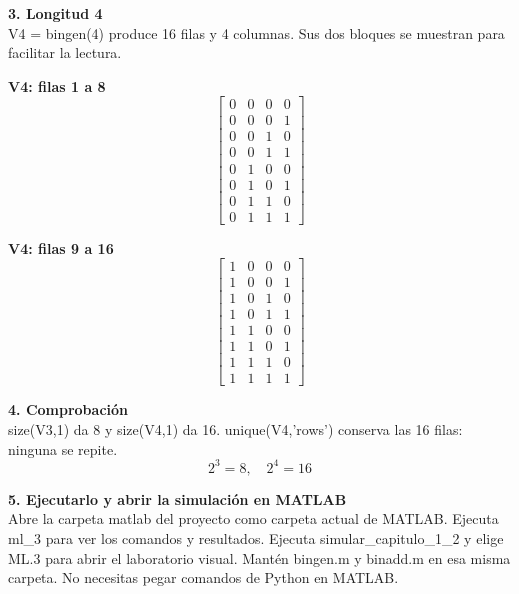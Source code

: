 \documentclass[11pt,a4paper,landscape]{article}
\begin{document}
\noindent\begin{minipage}{\linewidth}\textbf{3. Longitud 4}\\[2pt]V4 = bingen(4) produce 16 filas y 4 columnas. Sus dos bloques se muestran para facilitar la lectura.
\par\smallskip \begin{minipage}[t]{.47\linewidth}\centering \textbf{V4: filas 1 a 8}\[\begin{bmatrix}0 & 0 & 0 & 0\\0 & 0 & 0 & 1\\0 & 0 & 1 & 0\\0 & 0 & 1 & 1\\0 & 1 & 0 & 0\\0 & 1 & 0 & 1\\0 & 1 & 1 & 0\\0 & 1 & 1 & 1\end{bmatrix}\]\end{minipage}\hfill\begin{minipage}[t]{.47\linewidth}\centering \textbf{V4: filas 9 a 16}\[\begin{bmatrix}1 & 0 & 0 & 0\\1 & 0 & 0 & 1\\1 & 0 & 1 & 0\\1 & 0 & 1 & 1\\1 & 1 & 0 & 0\\1 & 1 & 0 & 1\\1 & 1 & 1 & 0\\1 & 1 & 1 & 1\end{bmatrix}\]\end{minipage}\par\smallskip
\end{minipage}\par\medskip
\noindent\begin{minipage}{\linewidth}\textbf{4. Comprobación}\\[2pt]size(V3,1) da 8 y size(V4,1) da 16. unique(V4,'rows') conserva las 16 filas: ninguna se repite.
\[2^3=8,\quad2^4=16\]
\end{minipage}\par\medskip
\noindent\begin{minipage}{\linewidth}\textbf{5. Ejecutarlo y abrir la simulación en MATLAB}\\[2pt]Abre la carpeta matlab del proyecto como carpeta actual de MATLAB. Ejecuta ml\_3 para ver los comandos y resultados. Ejecuta simular\_capitulo\_1\_2 y elige ML.3 para abrir el laboratorio visual. Mantén bingen.m y binadd.m en esa misma carpeta. No necesitas pegar comandos de Python en MATLAB.
\end{minipage}\par\medskip
\end{document}
